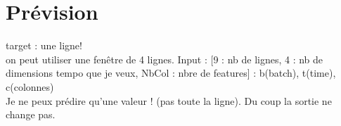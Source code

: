 \documentclass{article}
\begin{document}
    \section{Prévision}
    target : une ligne!\\ on peut utiliser une fenêtre de 4 lignes.
    Input : [9 : nb de lignes, 4 : nb de dimensions tempo que je veux, NbCol : nbre de features] : b(batch), t(time), c(colonnes)\\
    Je ne peux prédire qu'une valeur ! (pas toute la ligne). Du coup la sortie ne change pas.
    
\end{document}
